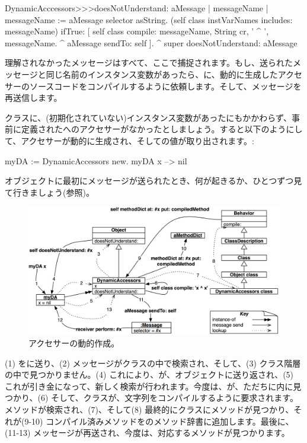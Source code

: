 \documentclass[a4paper,10pt,twoside]{book}
\begin{document}
\begin{code}{}
DynamicAcccessors>>>doesNotUnderstand: aMessage
	| messageName |
	messageName := aMessage selector asString.
	(self class instVarNames includes: messageName)
		ifTrue: [
			self class compile: messageName, String cr, ' ^ ', messageName.
			^ aMessage sendTo: self ].
	^ super doesNotUnderstand: aMessage
\end{code}
理解されなかったメッセージはすべて、ここで捕捉されます。もし、送られたメッセージと同じ名前のインスタンス変数があったら、に、動的に生成したアクセサーのソースコードをコンパイルするように依頼します。そして、メッセージを再送信します。

クラスに、(初期化されていない)インスタンス変数があったにもかかわらず、事前に定義されたへのアクセサーがなかったとしましょう。すると以下のようにして、アクセサーが動的に生成され、そしての値が取り出されます。:
\begin{code}{}
myDA := DynamicAccessors new.
myDA x --> nil
\end{code}

オブジェクトに最初にメッセージが送られたとき、何が起きるか、ひとつずつ見て行きましょう(参照)。

\begin{figure}[ht]\centering
	\includegraphics[width=\linewidth]{DynamicAccessors}
	\caption{アクセサーの動的作成。}
\end{figure}

(1) をに送り、(2) メッセージがクラスの中で検索され、そして、(3) クラス階層の中で見つかりません。(4) これにより、が、オブジェクトに送り返され、(5) これが引き金になって、新しく検索が行われます。今度は、が、ただちに内に見つかり、(6) そして、クラスが、文字列をコンパイルするように要求されます。メソッドが検索され、(7)、そして(8) 最終的にクラスにメソッドが見つかり、それが(9-10) コンパイル済みメソッドをのメソッド辞書に追加します。最後に、(11-13) メッセージが再送され、今度は、対応するメソッドが見つかります。 %
\end{document}
